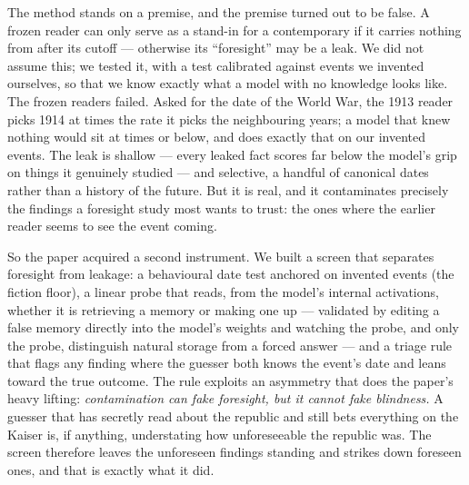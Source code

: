 \documentclass[11pt]{article}
\begin{document}
The method stands on a premise, and the premise turned out to be false. A frozen reader can only serve as
a stand-in for a contemporary if it carries nothing from after its cutoff --- otherwise its ``foresight''
may be a leak. We did not assume this; we tested it, with a test calibrated against events we invented
ourselves, so that we know exactly what a model with no knowledge looks like. The frozen readers failed.
Asked for the date of the World War, the 1913 reader picks 1914 at \NspikeWWIThirteen{} times the rate it
picks the neighbouring years; a model that knew nothing would sit at \NspikeNullNinetyFifthThirteen{}
times or below, and does exactly that on our invented events. The leak is shallow --- every leaked fact
scores far below the model's grip on things it genuinely studied --- and selective, a handful of
canonical dates rather than a history of the future. But it is real, and it contaminates precisely the
findings a foresight study most wants to trust: the ones where the earlier reader seems to see the event
coming.

So the paper acquired a second instrument. We built a screen that separates foresight from leakage: a
behavioural date test anchored on invented events (the fiction floor), a linear probe that reads, from
the model's internal activations, whether it is retrieving a memory or making one up --- validated by
editing a false memory directly into the model's weights and watching the probe, and only the probe,
distinguish natural storage from a forced answer --- and a triage rule that flags any finding where the
guesser both knows the event's date and leans toward the true outcome. The rule exploits an asymmetry
that does the paper's heavy lifting: \emph{contamination can fake foresight, but it cannot fake
blindness.} A guesser that has secretly read about the republic and still bets everything on the Kaiser
is, if anything, understating how unforeseeable the republic was. The screen therefore leaves the
unforeseen findings standing and strikes down foreseen ones, and that is exactly what it did.
\end{document}
